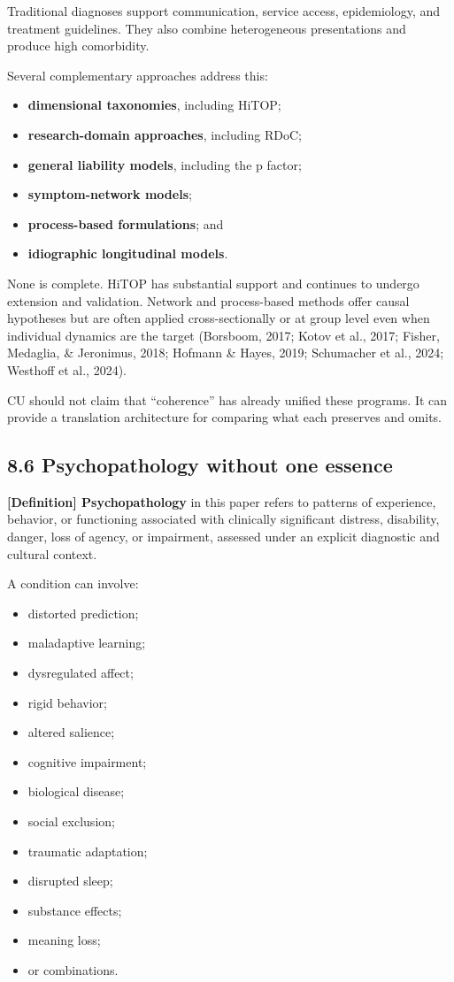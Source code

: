 \documentclass[
  11pt,
]{article}
\providecommand{\tightlist}{%
  \setlength{\itemsep}{0pt}\setlength{\parskip}{0pt}}
\begin{document}
Traditional diagnoses support communication, service access,
epidemiology, and treatment guidelines. They also combine heterogeneous
presentations and produce high comorbidity.

Several complementary approaches address this:

\begin{itemize}
\tightlist
\item
  \textbf{dimensional taxonomies}, including HiTOP;
\item
  \textbf{research-domain approaches}, including RDoC;
\item
  \textbf{general liability models}, including the p factor;
\item
  \textbf{symptom-network models};
\item
  \textbf{process-based formulations}; and
\item
  \textbf{idiographic longitudinal models}.
\end{itemize}

None is complete. HiTOP has substantial support and continues to undergo
extension and validation. Network and process-based methods offer causal
hypotheses but are often applied cross-sectionally or at group level
even when individual dynamics are the target (Borsboom, 2017; Kotov et
al., 2017; Fisher, Medaglia, \& Jeronimus, 2018; Hofmann \& Hayes, 2019;
Schumacher et al., 2024; Westhoff et al., 2024).

CU should not claim that ``coherence'' has already unified these
programs. It can provide a translation architecture for comparing what
each preserves and omits.

\subsection{8.6 Psychopathology without one
essence}\label{psychopathology-without-one-essence}

\textbf{{[}Definition{]} Psychopathology} in this paper refers to
patterns of experience, behavior, or functioning associated with
clinically significant distress, disability, danger, loss of agency, or
impairment, assessed under an explicit diagnostic and cultural context.

A condition can involve:

\begin{itemize}
\tightlist
\item
  distorted prediction;
\item
  maladaptive learning;
\item
  dysregulated affect;
\item
  rigid behavior;
\item
  altered salience;
\item
  cognitive impairment;
\item
  biological disease;
\item
  social exclusion;
\item
  traumatic adaptation;
\item
  disrupted sleep;
\item
  substance effects;
\item
  meaning loss;
\item
  or combinations.
\end{itemize}
\end{document}
